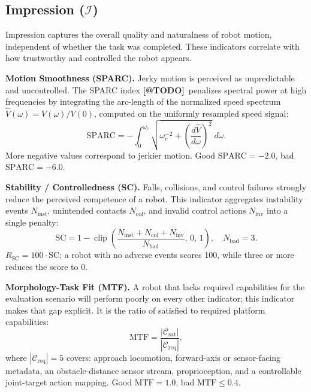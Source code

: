 \documentclass[conference]{IEEEtran}
\makeatletter
\newcommand{\tcite}{\textbf{[@TODO]}}
\makeatother
\begin{document}
\subsection{Impression ($\mathcal{I}$)}

Impression captures the overall quality and naturalness of robot motion,
independent of whether the task was completed. These indicators correlate with
how trustworthy and controlled the robot appears.

\textbf{Motion Smoothness (SPARC).}
Jerky motion is perceived as unpredictable and uncontrolled.
The SPARC index \tcite\ penalizes spectral power at high frequencies by
integrating the arc-length of the normalized speed spectrum
$\hat{V}(\omega) = V(\omega)/V(0)$, computed on the uniformly resampled
speed signal:
\begin{equation}
  \text{SPARC} = -\int_0^{\omega_c}
    \sqrt{\omega_c^{-2} +
      \left(\frac{d\hat{V}}{d\omega}\right)^{\!2}}\;d\omega.
  \label{eq:sparc}
\end{equation}
More negative values correspond to jerkier motion.
Good $\text{SPARC} = -2.0$, bad $\text{SPARC} = -6.0$.

\textbf{Stability / Controlledness (SC).}
Falls, collisions, and control failures strongly reduce the perceived
competence of a robot. This indicator aggregates instability events
$N_\text{inst}$, unintended contacts $N_\text{col}$, and invalid control
actions $N_\text{inv}$ into a single penalty:
\begin{equation}
  \text{SC} = 1 - \operatorname{clip}\!\left(
    \frac{N_\text{inst} + N_\text{col} + N_\text{inv}}{N_\text{bad}},
    \,0,\,1\right), \quad N_\text{bad} = 3.
\end{equation}
$R_\text{SC} = 100\cdot\text{SC}$; a robot with no adverse events scores
100, while three or more reduces the score to 0.

\textbf{Morphology-Task Fit (MTF).}
A robot that lacks required capabilities for the evaluation scenario will
perform poorly on every other indicator; this indicator makes that gap
explicit. It is the ratio of satisfied to required platform capabilities:
\begin{equation}
  \text{MTF} = \frac{|\mathcal{C}_\text{sat}|}{|\mathcal{C}_\text{req}|},
\end{equation}
where $|\mathcal{C}_\text{req}| = 5$ covers: approach locomotion,
forward-axis or sensor-facing metadata, an obstacle-distance sensor stream,
proprioception, and a controllable joint-target action mapping.
Good $\text{MTF} = 1.0$, bad $\text{MTF} \le 0.4$.
\end{document}
